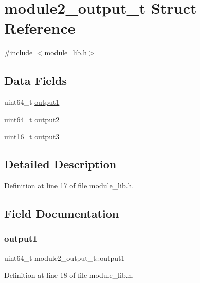 \hypertarget{structmodule2__output__t}{}\section{module2\+\_\+output\+\_\+t Struct Reference}
\label{structmodule2__output__t}


{\ttfamily \#include $<$module\+\_\+lib.\+h$>$}

\subsection*{Data Fields}
\begin{DoxyCompactItemize}
\item 
uint64\+\_\+t \hyperlink{structmodule2__output__t_a0b1c46ddaee43c19071381becbaeabc8}{output1}
\item 
uint64\+\_\+t \hyperlink{structmodule2__output__t_aa628fc0a1b293f0abfd3abd9e4351028}{output2}
\item 
uint16\+\_\+t \hyperlink{structmodule2__output__t_a883efd615406bacb023c91515697b061}{output3}
\end{DoxyCompactItemize}


\subsection{Detailed Description}


Definition at line 17 of file module\+\_\+lib.\+h.



\subsection{Field Documentation}
\mbox{\label{structmodule2__output__t_a0b1c46ddaee43c19071381becbaeabc8}} 
\subsubsection{\texorpdfstring{output1}{output1}}
{\footnotesize\ttfamily uint64\+\_\+t module2\+\_\+output\+\_\+t\+::output1}



Definition at line 18 of file module\+\_\+lib.\+h.



